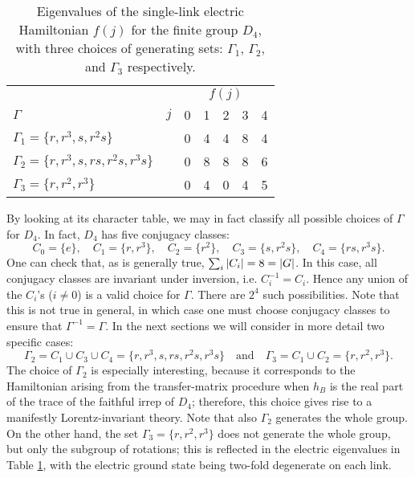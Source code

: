 \begin{table}[t]
    \centering
    \begin{tabular}{lcccccc}
        \toprule
         & & \multicolumn{5}{c}{$f(j)$} \\
        \cmidrule(l){3-7}
        \hspace{5em}$\Gamma$ & $j$ & 0 & 1 & 2 & 3 & 4\\
        \midrule
        $\Gamma_1 = \{r, r^3, s, r^2 s \}$
                 & & 0 & 4 & 4 & 8 & 4 \\[5pt]
        $\Gamma_2 = \{r, r^3, s, r s, r^2 s, r^3 s \}$
                       & & 0 & 8 & 8 & 8 & 6 \\[5pt]
        $\Gamma_3 = \{r, r^2, r^3 \}$
                 & & 0 & 4 & 0 & 4 & 5 \\
        \bottomrule
    \end{tabular}
    \caption{Eigenvalues of the single-link electric Hamiltonian $f(j)$ for the finite group $D_4$, with three choices of generating sets: $\Gamma_1$, $\Gamma_2$, and $\Gamma_3$ respectively.}
    \label{tab:fval}
\end{table}

By looking at its character table, we may in fact classify all possible choices of $\Gamma$ for $D_4$.
In fact, $D_4$ has five conjugacy classes:
\begin{equation*}
    C_0 = \{e\}, \quad
    C_1 = \{r, r^3\}, \quad
    C_2 = \{r^2\}, \quad
    C_3 = \{s, r^2s\}, \quad
    C_4 = \{rs, r^3s\}.
\end{equation*}
One can check that, as is generally true, $\sum_i \abs{C_i}=8=\abs{G}$.
In this case, all conjugacy classes are invariant under inversion, i.e.
$C_i^{-1}=C_i$.
 Hence any union of the $C_i$'s ($i \neq 0$) is a valid choice for $\Gamma$.
There are $2^4$ such possibilities.
Note that this is not true in general, in which case one must choose conjugacy classes to ensure that $\Gamma^{-1}=\Gamma$.
In the next sections we will consider in more detail two specific cases:
\begin{equation*}
        \Gamma_2 = C_1 \cup C_3 \cup C_4=\{r, r^3, s, rs, r^2s, r^3s\}
        \quad \text{and} \quad
        \Gamma_3 = C_1 \cup C_2 = \{r, r^2, r^3\}.
\end{equation*}
The choice of $\Gamma_2$ is especially interesting, because it corresponds to the Hamiltonian arising from the transfer-matrix procedure when $h_B$ is the real part of the trace of the faithful \ac{irrep} of $D_4$; therefore, this choice gives rise to a manifestly Lorentz-invariant theory.
Note that also $\Gamma_2$ generates the whole group.
On the other hand, the set $\Gamma_3 = \{r, r^2, r^3\}$ does not generate the whole group, but only the subgroup of rotations;
this is reflected in the electric eigenvalues in Table \ref{tab:fval}, with the electric ground state being two-fold degenerate on each link.




